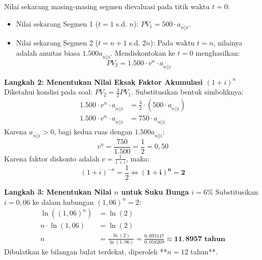 \documentclass[11pt,a4paper]{article}
\newcommand{\angl}[1]{\overline{#1|}}
\begin{document}
\begin{solusibox}[5]
Nilai sekarang masing-masing segmen dievaluasi pada titik waktu $t=0$:
\begin{itemize}[leftmargin=4mm, topsep=1pt, itemsep=1pt]
    \item Nilai sekarang Segmen 1 ($t = 1$ s.d. $n$): $PV_1 = 500 \cdot a_{\angl{n}|i}$.
    \item Nilai sekarang Segmen 2 ($t = n+1$ s.d. $2n$): Pada waktu $t=n$, nilainya adalah anuitas biasa $1.500 a_{\angl{n}|i}$. Mendiskontokan ke $t=0$ menghasilkan:
    $$PV_2 = 1.500 \cdot v^n \cdot a_{\angl{n}|i}$$
\end{itemize}

\textbf{Langkah 2: Menentukan Nilai Eksak Faktor Akumulasi $(1+i)^n$}  
Diketahui kondisi pada soal: $PV_2 = \frac{3}{2} PV_1$. Substitusikan bentuk simboliknya:
\begin{align*}
    1.500 \cdot v^n \cdot a_{\angl{n}|i} &= \frac{3}{2} \cdot \left(500 \cdot a_{\angl{n}|i}\right) \\
    1.500 \cdot v^n \cdot a_{\angl{n}|i} &= 750 \cdot a_{\angl{n}|i}
\end{align*}
Karena $a_{\angl{n}|i} > 0$, bagi kedua ruas dengan $1.500 a_{\angl{n}|i}$:
$$v^n = \frac{750}{1.500} = \frac{1}{2} = 0{,}50$$
Karena faktor diskonto adalah $v = \frac{1}{1+i}$, maka:
$$(1+i)^{-n} = \frac{1}{2} \iff \mathbf{(1+i)^n = 2}$$

\textbf{Langkah 3: Menentukan Nilai $n$ untuk Suku Bunga $i = 6\%$}  
Substitusikan $i = 0{,}06$ ke dalam hubungan $(1{,}06)^n = 2$:
\begin{align*}
    \ln\left((1{,}06)^n\right) &= \ln(2) \\
    n \cdot \ln(1{,}06) &= \ln(2) \\
    n &= \frac{\ln(2)}{\ln(1{,}06)} = \frac{0{,}693147}{0{,}058269} \approx \mathbf{11{,}8957 \text{ tahun}}
\end{align*}
Dibulatkan ke bilangan bulat terdekat, diperoleh **$n = 12$ tahun**.
\end{solusibox}

\newpage
\end{document}
